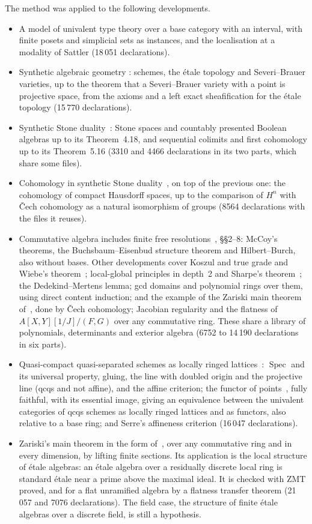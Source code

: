 \documentclass[11pt]{article}
\begin{document}
The method was applied to the following developments.
\begin{itemize}
\item A model of univalent type theory over a base category with an
  interval, with finite posets and simplicial sets as instances, and the
  localisation at a modality of Sattler (18\,051 declarations).
\item Synthetic algebraic geometry \cite{SAG}: schemes, the \'etale
  topology and Severi--Brauer varieties, up to the theorem that a
  Severi--Brauer variety with a point is projective space, from the
  axioms and a left exact sheafification for the \'etale
  topology (15\,770 declarations).
\item Synthetic Stone duality~\cite{SSD}: Stone spaces and countably
  presented Boolean algebras up to its Theorem~4.18, and sequential
  colimits and first cohomology up to its Theorem~5.16 (3310 and 4466
  declarations in its two parts, which share some files).
\item Cohomology in synthetic Stone duality~\cite{CCA}, on top of the
  previous one: the cohomology of compact Hausdorff spaces, up to the
  comparison of $H^n$ with \v{C}ech cohomology as a natural isomorphism
  of groups (8564 declarations with the files it reuses).
\item Commutative algebra includes finite free resolutions~\cite{CQ},
  \S\S2--8: McCoy's theorems, the Buchsbaum--Eisenbud structure theorem
  and Hilbert--Burch, also without bases. Other developments cover
  Koszul and true grade and Wiebe's
  theorem~\cite{CT}; local-global principles in depth~2 and Sharpe's
  theorem~\cite{CL}; the Dedekind--Mertens lemma; gcd domains and
  polynomial rings over them, using direct content induction; and the example of the Zariski main
  theorem of~\cite{ACL}, done by \v{C}ech cohomology; Jacobian
  regularity and the flatness of $A[X,Y][1/J]/(F,G)$ over any
  commutative ring. These share a library of polynomials, determinants
  and exterior algebra (6752 to 14\,190 declarations in six parts).
\item Quasi-compact quasi-separated schemes as locally ringed
  lattices~\cite{Zeu}: $\operatorname{Spec}$ and its universal property,
  gluing, the line with doubled origin and the projective line (qcqs and
  not affine), and the affine criterion; the functor of
  points~\cite{ZH}, fully faithful, with its essential image, giving an
  equivalence between the univalent categories of qcqs schemes as
  locally ringed lattices and as functors, also relative to a base ring;
  and Serre's affineness criterion (16\,047 declarations).
\item Zariski's main theorem in the form of~\cite{ACL}, over any
  commutative ring and in every dimension, by lifting finite sections.
  Its application is the local structure of \'etale algebras: an \'etale
  algebra over a residually discrete local ring is standard \'etale near
  a prime above the maximal ideal. It is checked with ZMT proved, and
  for a flat unramified algebra by a flatness transfer theorem
  (21\,057 and 7076 declarations). The field case, the structure of
  finite \'etale algebras over a discrete field, is still a hypothesis.
\end{itemize}
\end{document}

